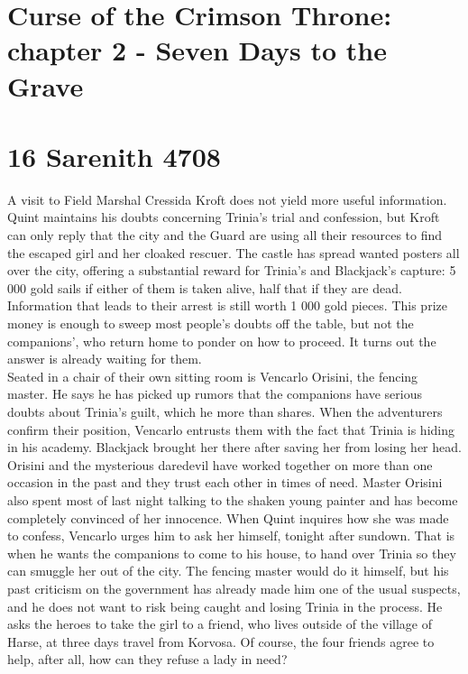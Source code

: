 \section{Curse of the Crimson Throne: chapter 2 - Seven Days to the Grave}

\section{16 Sarenith 4708}

A visit to Field Marshal Cressida Kroft does not yield more useful information. Quint maintains his doubts concerning Trinia's trial and confession, but Kroft can only reply that the city and the Guard are using all their resources to find the escaped girl and her cloaked rescuer. The castle has spread wanted posters all over the city, offering a substantial reward for Trinia's and Blackjack's capture: 5 000 gold sails if either of them is taken alive, half that if they are dead. Information that leads to their arrest is still worth 1 000 gold pieces. This prize money is enough to sweep most people's doubts off the table, but not the companions', who return home to ponder on how to proceed. It turns out the answer is already waiting for them.\\

Seated in a chair of their own sitting room is Vencarlo Orisini, the fencing master. He says he has picked up rumors that the companions have serious doubts about Trinia's guilt, which he more than shares. When the adventurers confirm their position, Vencarlo entrusts them with the fact that Trinia is hiding in his academy. Blackjack brought her there after saving her from losing her head. Orisini and the mysterious daredevil have worked together on more than one occasion in the past and they trust each other in times of need. Master Orisini also spent most of last night talking to the shaken young painter and has become completely convinced of her innocence. When Quint inquires how she was made to confess, Vencarlo urges him to ask her himself, tonight after sundown. That is when he wants the companions to come to his house, to hand over Trinia so they can smuggle her out of the city. The fencing master would do it himself, but his past criticism on the government has already made him one of the usual suspects, and he does not want to risk being caught and losing Trinia in the process. He asks the heroes to take the girl to a friend, who lives outside of the village of Harse, at three days travel from Korvosa. Of course, the four friends agree to help, after all, how can they refuse a lady in need?\\

